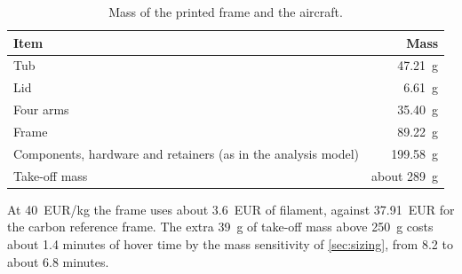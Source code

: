 \begin{table}[htbp]
\centering\small
\caption{Mass of the printed frame and the aircraft.}\label{tab:mass}
\begin{tabular}{@{}lr@{}}
\toprule
Item & Mass\\
\midrule
Tub & \SI{47.21}{g}\\
Lid & \SI{6.61}{g}\\
Four arms & \SI{35.40}{g}\\
\midrule
Frame & \SI{89.22}{g}\\
Components, hardware and retainers (as in the analysis model) & \SI{199.58}{g}\\
\midrule
Take-off mass & about \SI{289}{g}\\
\bottomrule
\end{tabular}
\end{table}

At \SI{40}{EUR/kg} the frame uses about \SI{3.6}{EUR} of filament, against \SI{37.91}{EUR} for the carbon reference frame. The extra \SI{39}{g} of take-off mass above \SI{250}{g} costs about 1.4 minutes of hover time by the mass sensitivity of \cref{sec:sizing}, from 8.2 to about 6.8 minutes.
